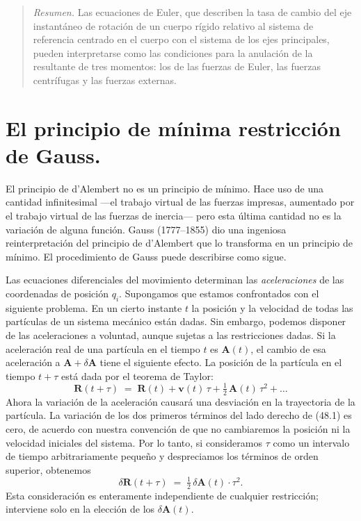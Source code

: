 \documentclass[12pt,a4paper]{book}
\begin{document}
\begin{quote}
\textit{Resumen.} Las ecuaciones de Euler, que describen la tasa de cambio del eje instantáneo de rotación de un cuerpo rígido relativo al sistema de referencia centrado en el cuerpo con el sistema de los ejes principales, pueden interpretarse como las condiciones para la anulación de la resultante de tres momentos: los de las fuerzas de Euler, las fuerzas centrífugas y las fuerzas externas.
\end{quote}

\section{El principio de mínima restricción de Gauss.}

El principio de d'Alembert no es un principio de mínimo. Hace uso de una cantidad infinitesimal ---el trabajo virtual de las fuerzas impresas, aumentado por el trabajo virtual de las fuerzas de inercia--- pero esta última cantidad no es la variación de alguna función. Gauss (1777--1855) dio una ingeniosa reinterpretación del principio de d'Alembert que lo transforma en un principio de mínimo. El procedimiento de Gauss puede describirse como sigue.

Las ecuaciones diferenciales del movimiento determinan las \textit{aceleraciones} de las coordenadas de posición $q_i$. Supongamos que estamos confrontados con el siguiente problema. En un cierto instante $t$ la posición y la velocidad de todas las partículas de un sistema mecánico están dadas. Sin embargo, podemos disponer de las aceleraciones a voluntad, aunque sujetas a las restricciones dadas. Si la aceleración real de una partícula en el tiempo $t$ es $\mathbf{A}(t)$, el cambio de esa aceleración a $\mathbf{A} + \delta\mathbf{A}$ tiene el siguiente efecto. La posición de la partícula en el tiempo $t + \tau$ está dada por el teorema de Taylor:
\begin{equation}
\mathbf{R}(t + \tau) \;=\; \mathbf{R}(t) + \mathbf{v}(t)\,\tau + \tfrac{1}{2}\,\mathbf{A}(t)\,\tau^2 + \ldots \tag{48.1}
\end{equation}
Ahora la variación de la aceleración causará una desviación en la trayectoria de la partícula. La variación de los dos primeros términos del lado derecho de (48.1) es cero, de acuerdo con nuestra convención de que no cambiaremos la posición ni la velocidad iniciales del sistema. Por lo tanto, si consideramos $\tau$ como un intervalo de tiempo arbitrariamente pequeño y despreciamos los términos de orden superior, obtenemos
\begin{equation}
\delta\mathbf{R}(t + \tau) \;=\; \tfrac{1}{2}\,\delta\mathbf{A}(t) \cdot \tau^2. \tag{48.2}
\end{equation}
Esta consideración es enteramente independiente de cualquier restricción; interviene solo en la elección de los $\delta\mathbf{A}(t)$.
\end{document}
